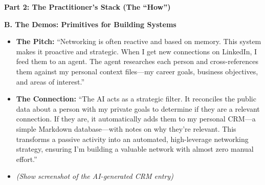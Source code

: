 \documentclass[
  ignorenonframetext,
  aspectratio=169,
]{beamer}
\providecommand{\tightlist}{%
  \setlength{\itemsep}{0pt}\setlength{\parskip}{0pt}}
\begin{document}
\begin{frame}{\textbf{Part 2: The Practitioner's Stack (The ``How'')}}
\begin{block}{\textbf{B. The Demos: Primitives for Building Systems}}
\begin{itemize}
  \begin{itemize}
  \tightlist
  \item
    \textbf{The Pitch:} ``Networking is often reactive and based on
    memory. This system makes it proactive and strategic. When I get new
    connections on LinkedIn, I feed them to an agent. The agent
    researches each person and cross-references them against my personal
    context files---my career goals, business objectives, and areas of
    interest.''\\
  \item
    \textbf{The Connection:} ``The AI acts as a strategic filter. It
    reconciles the public data about a person with my private goals to
    determine if they are a relevant connection. If they are, it
    automatically adds them to my personal CRM---a simple Markdown
    database---with notes on why they're relevant. This transforms a
    passive activity into an automated, high-leverage networking
    strategy, ensuring I'm building a valuable network with almost zero
    manual effort.''\\
  \item
    \emph{(Show screenshot of the AI-generated CRM entry)}
  \end{itemize}
\end{itemize}
\end{block}
\end{frame}
\end{document}
